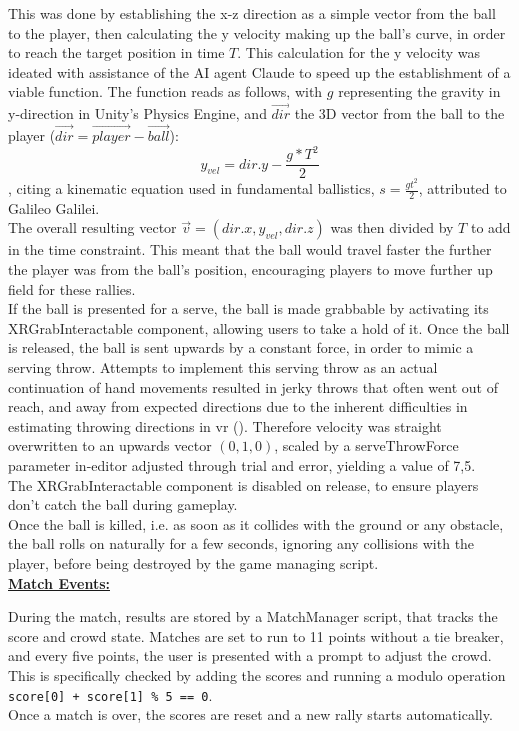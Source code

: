 This was done by establishing the x-z direction as a simple vector from the ball to the player, then calculating the y velocity making up the ball's curve, in order to reach the target position in time $T$. This calculation for the y velocity was ideated with assistance of the AI agent Claude to speed up the establishment of a viable function. The function reads as follows, with $g$ representing the gravity in y-direction in Unity's Physics Engine, and $\overrightarrow{dir}$ the 3D vector from the ball to the player ($\overrightarrow{dir} = \overrightarrow{player} - \overrightarrow{ball}$): \[y_{vel} = dir.y - \frac{g * T^2}{2}\], citing a kinematic equation used in fundamental ballistics, $s = \frac{gt^2}{2}$, attributed to Galileo Galilei.\\
The overall resulting vector $\overrightarrow{v} = (dir.x, y_{vel}, dir.z)$ was then divided by $T$ to add in the time constraint. This meant that the ball would travel faster the further the player was from the ball's position, encouraging players to move further up field for these rallies.\\

If the ball is presented for a serve, the ball is made grabbable by activating its XRGrabInteractable component, allowing users to take a hold of it. Once the ball is released, the ball is sent upwards by a constant force, in order to mimic a serving throw. Attempts to implement this serving throw as an actual continuation of hand movements resulted in jerky throws that often went out of reach, and away from expected directions due to the inherent difficulties in estimating throwing directions in \gls{vr} (\cite{zindulka2020performance}). Therefore velocity was straight overwritten to an upwards vector $(0, 1, 0)$, scaled by a serveThrowForce parameter in-editor adjusted through trial and error, yielding a value of 7,5.\\
The XRGrabInteractable component is disabled on release, to ensure players don't catch the ball during gameplay.\\

Once the ball is killed, i.e. as soon as it collides with the ground or any obstacle, the ball rolls on naturally for a few seconds, ignoring any collisions with the player, before being destroyed by the game managing script.\\

\noindent\textbf{\underline{Match Events:}}

During the match, results are stored by a MatchManager script, that tracks the score and crowd state. Matches are set to run to 11 points without a tie breaker, and every five points, the user is presented with a prompt to adjust the crowd. This is specifically checked by adding the scores and running a modulo operation \verb|score[0] + score[1] % 5 == 0|.\\
Once a match is over, the scores are reset and a new rally starts automatically.

